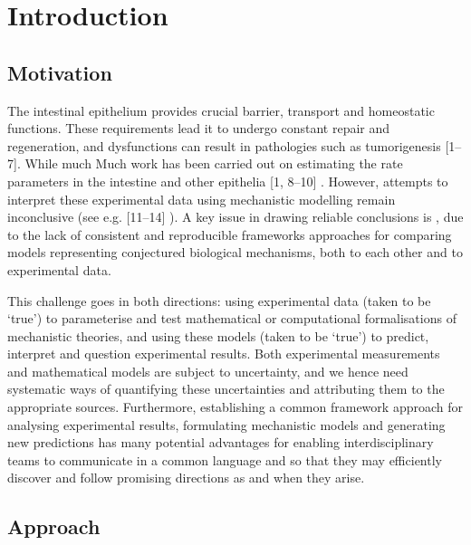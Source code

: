 \documentclass[10pt,letterpaper]{article}
\providecommand{\DIFaddtex}[1]{{\protect\color{blue} \sf #1}} %
\providecommand{\DIFdeltex}[1]{{\protect\color{red} \scriptsize #1}} %
\providecommand{\DIFaddbegin}{} %
\providecommand{\DIFaddend}{} %
\providecommand{\DIFdelbegin}{} %
\providecommand{\DIFdelend}{} %
\providecommand{\DIFadd}[1]{\texorpdfstring{\DIFaddtex{#1}}{#1}} %
\providecommand{\DIFdel}[1]{\texorpdfstring{\DIFdeltex{#1}}{}} %
\begin{document}
\linenumbers

\section{Introduction}\label{introduction}

\subsection{Motivation}\label{motivation}

The intestinal epithelium provides crucial barrier, transport and
homeostatic functions. These requirements lead it to undergo constant
repair and regeneration, and dysfunctions can result in pathologies such
as tumorigenesis {[}1--7{]}. \DIFdelbegin \DIFdel{While much }\DIFdelend \DIFaddbegin \DIFadd{Much }\DIFaddend work has been carried out on
estimating the rate parameters in the intestine and other epithelia
{[}1, 8--10{]}\DIFaddbegin \DIFadd{. However}\DIFaddend , attempts to interpret these experimental data
using mechanistic modelling remain inconclusive \DIFdelbegin \DIFdel{(see e.g. }\DIFdelend {[}11--14{]}\DIFdelbegin \DIFdel{). A key
issue in drawing reliable conclusions is }\DIFdelend \DIFaddbegin \DIFadd{, due to }\DIFaddend the
lack of consistent and reproducible \DIFdelbegin \DIFdel{frameworks }\DIFdelend \DIFaddbegin \DIFadd{approaches }\DIFaddend for comparing models
representing conjectured biological mechanisms, both to each other and
to experimental data.

This challenge goes in both directions: using experimental data (taken
to be `true') to parameterise and test mathematical or computational
formalisations of mechanistic theories, and using these models (taken to
be `true') to predict, interpret and question experimental results. Both
experimental measurements and mathematical models are subject to
uncertainty, and we hence need systematic ways of quantifying these
uncertainties and attributing them to the appropriate sources.
Furthermore, establishing a common \DIFdelbegin \DIFdel{framework }\DIFdelend \DIFaddbegin \DIFadd{approach }\DIFaddend for analysing experimental
results, formulating mechanistic models and generating new predictions
has many potential advantages for enabling interdisciplinary teams to
communicate in a common language \DIFdelbegin \DIFdel{and }\DIFdelend \DIFaddbegin \DIFadd{so that they may }\DIFaddend efficiently discover
and follow promising directions as and when they arise.

\subsection{Approach}\label{approach}
\end{document}
